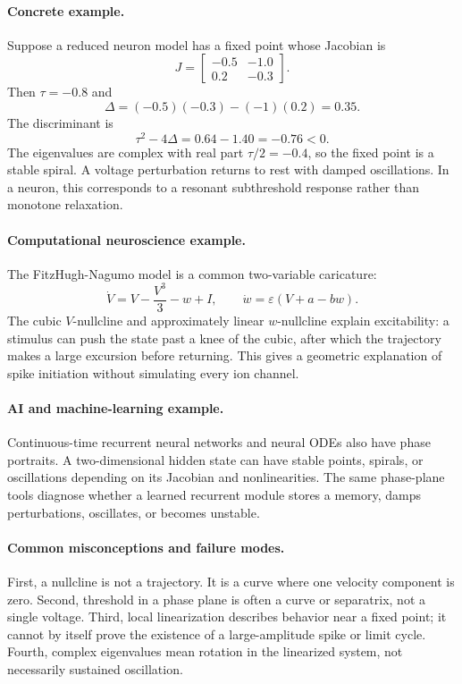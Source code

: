 \paragraph{Concrete example.}
Suppose a reduced neuron model has a fixed point whose Jacobian is
\[
J=
\begin{bmatrix}
-0.5 & -1.0\\
0.2 & -0.3
\end{bmatrix}.
\]
Then \(\tau=-0.8\) and
\[
\Delta=(-0.5)(-0.3)-(-1)(0.2)=0.35.
\]
The discriminant is
\[
\tau^2-4\Delta=0.64-1.40=-0.76<0.
\]
The eigenvalues are complex with real part \(\tau/2=-0.4\), so the fixed point is a stable spiral. A voltage perturbation returns to rest with damped oscillations. In a neuron, this corresponds to a resonant subthreshold response rather than monotone relaxation.

\paragraph{Computational neuroscience example.}
The FitzHugh-Nagumo model is a common two-variable caricature:
\[
\dot V=V-\frac{V^3}{3}-w+I,\qquad
\dot w=\varepsilon(V+a-bw).
\]
The cubic \(V\)-nullcline and approximately linear \(w\)-nullcline explain excitability: a stimulus can push the state past a knee of the cubic, after which the trajectory makes a large excursion before returning. This gives a geometric explanation of spike initiation without simulating every ion channel.

\paragraph{AI and machine-learning example.}
Continuous-time recurrent neural networks and neural ODEs also have phase portraits. A two-dimensional hidden state can have stable points, spirals, or oscillations depending on its Jacobian and nonlinearities. The same phase-plane tools diagnose whether a learned recurrent module stores a memory, damps perturbations, oscillates, or becomes unstable.

\paragraph{Common misconceptions and failure modes.}
First, a nullcline is not a trajectory. It is a curve where one velocity component is zero. Second, threshold in a phase plane is often a curve or separatrix, not a single voltage. Third, local linearization describes behavior near a fixed point; it cannot by itself prove the existence of a large-amplitude spike or limit cycle. Fourth, complex eigenvalues mean rotation in the linearized system, not necessarily sustained oscillation.

